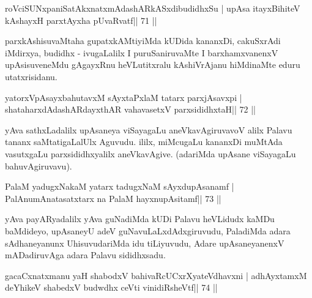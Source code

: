 
\begin{shl}
roVciSUNxpaniSatAkxnatxmAdashARkASxdibudidhxSu |
upAsa itayxBihiteV kAshayxH parxtAyxha pUvaRvatf\hfill || 71 ||
\end{shl}

\begin{artha}
parxkAshisuvaMtaha gupatxkAMtiyiMda kUDida kananxDi, cakuSxrAdi  iMdirxya, budidhx - ivugaLalilx I puruSaniruvaMte I barxhamxvanenxV upAsisuveneMdu gAgayxRnu heVLutitxralu kAshiVrAjanu hiMdinaMte eduru utatxrisidanu.
\end{artha}


\begin{shl}
yatorxVpAsayxbahutavxM sAyxtaPxlaM tatarx parxjAsavxpi |
shataharxdAdashARdayxthAR vahavasetxV parxsididhxtaH\hfill || 72 ||
\end{shl}

\begin{artha}
yAva sathxLadalilx upAsaneya viSayagaLu aneVkavAgiruvavoV alilx Palavu tananx saMtatigaLalUlx Aguvudu. ililx, miMcugaLu kananxDi muMtAda vasutxgaLu parxsididhxyalilx aneVkavAgive. (adariMda upAsane viSayagaLu bahuvAgiruvavu).
\end{artha} 
 

\begin{shl}
PalaM yadugxNakaM yatarx tadugxNaM sAyxdupAsanamf |
PalAnumAnatasatxtarx na PalaM hayxnupAsitamf\hfill || 73 ||
\end{shl}

\begin{artha}
yAva payARyadalilx yAva guNadiMda kUDi Palavu heVLidudx kaMDu  baMdideyo, upAsaneyU adeV guNavuLaLxdAdxgiruvudu, PaladiMda adara  sAdhaneyanunx UhisuvudariMda idu tiLiyuvudu, Adare upAsaneyanenxV mADadiruvAga adara Palavu sididhxsadu.
\end{artha}


\begin{shl}
gacaCxnatxmanu yaH shabodxV bahivaRcUCxrXyateV\s dhavxni |
adhAyxtamxM deYhikeV shabedxV budwdhx ceVti vinidiRsheVtf\hfill || 74 ||
\end{shl}

